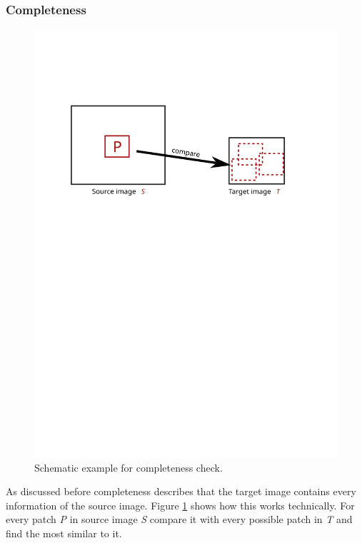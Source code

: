 \subsubsection*{Completeness}
\begin{figure}[h]
\centering
\includegraphics[scale=0.65]{img/completeness}
\caption[Completenesse]{Schematic example for completeness check.}
\label{fig:Completeness}
\end{figure}

As discussed before completeness describes that the target image contains every information of the source image. Figure \ref{fig:Completeness} shows how this works technically. For every patch \textit{P} in source image \textit{S} compare it with every possible patch in \textit{T} and find the most similar to it.

